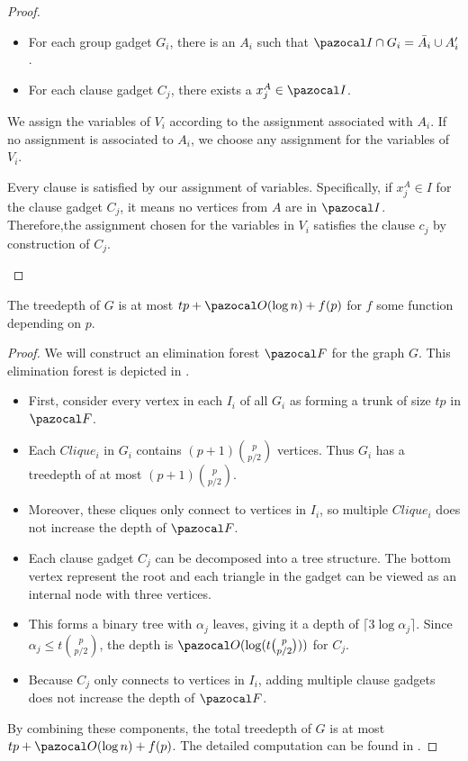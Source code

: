 \begin{proof}
\begin{itemize}
        \begin{itemize}
            \item For each group gadget $G_i$, there is an $A_i$ such that $\I \cap G_i = \bar{A_i} \cup A_i'$.
            \item For each clause gadget $C_j$, there exists a $x_j^A \in \I$.
        \end{itemize}

        We assign the variables of $V_i$ according to the assignment associated with $A_i$. If no assignment is associated to $A_i$, we choose any assignment for the variables of $V_i$.
        
        Every clause is satisfied by our assignment of variables. Specifically, if $x_j^A \in I$ for the clause gadget $C_j$, it means no vertices from $A$ are in $\I$. Therefore,the assignment chosen for the variables in $V_i$ satisfies the clause $c_j$ by construction of $C_j$.
    \end{itemize}
\end{proof}

\begin{lemma}
    \label{lemma:indset-sat-graph-td}
    The treedepth of $G$ is at most $tp + \O(\log n) + f(p)$ for $f$ some function depending on $p$.
\end{lemma}

\begin{proof}
    We will construct an elimination forest $\F$ for the graph $G$. This elimination forest is depicted in .
    
    \begin{itemize}
        \item First, consider every vertex in each $I_i$ of all $G_i$ as forming a trunk of size $tp$ in $\F$.
        \item  Each $Clique_i$ in $G_i$ contains $(p+1)\binom{p}{p/2}$ vertices. Thus $G_i$ has a treedepth of at most $(p+1)\binom{p}{p/2}$.
        \item Moreover, these cliques only connect to vertices in $I_i$, so multiple $Clique_i$ does not increase the depth of $\F$.
        \item Each clause gadget $C_j$ can be decomposed into a tree structure. The bottom vertex represent the root and each triangle in the gadget can be viewed as an internal node with three vertices.
        \item This forms a binary tree with $\alpha_j$ leaves, giving it a depth of $\lceil3\log{\alpha_j}\rceil$. Since $\alpha_j \leq t\binom{p}{p/2}$, the depth is $\O(\log(t\binom{p}{p/2}))$ for $C_j$.
        \item Because $C_j$ only connects to vertices in $I_i$, adding multiple clause gadgets does not increase the depth of $\F$.
    \end{itemize}

    \medskip

    By combining these components, the total treedepth of $G$ is at most $tp + \O(\log n) + f(p)$. The detailed computation can be found in .
\end{proof}

